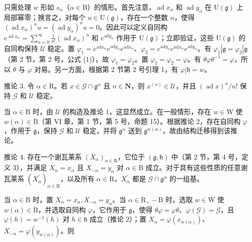只需处理 \(w\) 形如 \(s_{\alpha}\)（\(\alpha \in \mathrm{B}\)）的情形。首先注意，\(\operatorname{ad} x_{\alpha}\) 和 \(\operatorname{ad} y_{\alpha}\) 在 \(\mathrm{U}(\mathfrak{g})\) 上局部幂零；换言之，对每个 \(u \in \mathrm{U}(\mathfrak{g})\)，存在一个整数 \(n\)，使得 \((\operatorname{ad} x_{\alpha})^n u = (\operatorname{ad} y_{\alpha})^n u = 0\)。因此可以定义自同构 \(e^{\operatorname{ad} x_{\alpha}} = \sum_{n=0}^{\infty} \frac{1}{n!} (\operatorname{ad} x_{\alpha})^n\) 和 \(e^{\mathrm{ad}y_{\alpha}}\) 作用于 \(\mathrm{U}(\mathfrak{g})\)；立即验证，这些 \(\mathrm{U}(\mathfrak{g})\) 的自同构保持 \(\mathcal{U}\) 稳定。置 \(\varphi_1 = e^{\mathrm{ad}x_\alpha}e^{\mathrm{ad}y_\alpha}e^{\mathrm{ad}x_\alpha}\)、\(\varphi_2 = e^{\mathrm{ad}y_\alpha}e^{\mathrm{ad}x_\alpha}e^{\mathrm{ad}y_\alpha}\)。有 \(\varphi_1|\mathfrak{g} = \varphi_2|\mathfrak{g}\)（第 2 节，第 2 号，公式 (1)），故 \(\varphi_1 = \varphi_2\)。置 \(\varphi_1 = \varphi_2 = \varphi\)。有 \(\theta \varphi \theta^{-1} = \varphi\)，所以 \(\theta\) 与 \(\varphi\) 对易。另一方面，根据第 2 节第 2 号引理 1，有 \(\varphi |\mathfrak{h} = w\)。

推论 3. 令 \(\alpha \in \mathrm{R}\)。若 \(x \in \mathcal{G} \cap \mathfrak{g}^{\alpha}\) 且 \(n \in \mathbf{N}\)，则 \(x^{(n)} \in \mathcal{U}\)，并且 \((\operatorname{ad} x)^n / n!\) 保持 \(\mathcal{G}\) 和 \(\mathcal{U}\) 稳定。

当 \(\alpha \in \mathrm{B}\) 时，由 \(\mathcal{U}\) 的构造及推论 1，这显然成立。在一般情形，存在 \(w \in \mathrm{W}\) 使 \(w(\alpha) \in \mathrm{B}\)（第 VI 章，第 1 节，第 5 号，命题 15）。根据推论 2，存在自同构 \(\varphi\)，作用于 \(\mathfrak{g}\)，保持 \(\mathcal{G}\) 和 \(\mathcal{U}\) 稳定，并将 \(\mathfrak{g}^{\alpha}\) 送到 \(\mathfrak{g}^{w(\alpha)}\)，故由结构迁移得到该推论。

推论 4. 存在一个谢瓦莱系 \((X_{\alpha})_{\alpha \in \mathrm{R}}\)，它位于 \((\mathfrak{g},\mathfrak{h})\) 中（第 2 节，第 4 号，定义 3），并满足 \(X_{\alpha} = x_{\alpha}\) 且 \(X_{-\alpha} = y_{\alpha}\) 对 \(\alpha \in \mathrm{B}\) 成立。对于具有这些性质的任意谢瓦莱系 \((X_{\alpha}^{\prime})_{\alpha \in \mathrm{R}}\)，以及所有 \(\alpha \in \mathrm{R}\)，\(X_{\alpha}^{\prime}\) 都是 \(\mathcal{G} \cap \mathfrak{g}^{\alpha}\) 的一组基。

当 \(\alpha \in \mathrm{B}\) 时，置 \(X_{\alpha} = x_{\alpha}, X_{-\alpha} = y_{\alpha}\)。当 \(\alpha \in \mathrm{R}_{+} - \mathrm{B}\) 时，选取 \(w \in \mathrm{W}\) 使 \(w(\alpha) \in \mathrm{B}\)，并选取自同构 \(\varphi\)，它作用于 \(\mathfrak{g}\)，使得 \(\theta \varphi = \varphi \theta\)、\(\varphi(\mathcal{G}) = \mathcal{G}\)，且 \(\varphi(h) = w^{-1}(h)\) 对 \(h \in \mathfrak{h}\) 成立（推论 2）；置 \(X_{\alpha} = \varphi(x_{w(\alpha)})\)、\(X_{-\alpha} = \varphi(y_{w(\alpha)})\)。则

